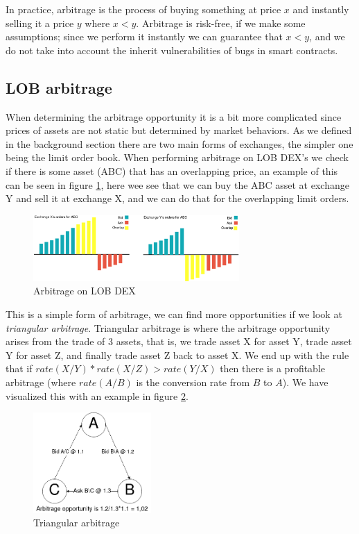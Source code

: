 In practice, arbitrage is the process of buying something at price $x$
and instantly selling it a price $y$ where $x<y$. Arbitrage is
risk-free, if we make some assumptions; since we perform it instantly
we can guarantee that $x<y$, and we do not take into account the
inherit vulnerabilities of bugs in smart contracts.

\subsection{LOB arbitrage}

When determining the arbitrage opportunity it is a bit more
complicated since prices of assets are not static but determined by
market behaviors. As we defined in the background section there are
two main forms of exchanges, the simpler one being the limit order
book. When performing arbitrage on LOB DEX's we check if there is some
asset (ABC) that has an overlapping price, an example of this can be
seen in figure \ref{fig:ArbLOB}, here wee see that we can buy the ABC
asset at exchange Y and sell it at exchange X, and we can do that for
the overlapping limit orders.
\begin{figure}[h]
\centering
\includegraphics[width=0.7\textwidth]{assests/Flash-loans-Arbitrage-Overlap-1}
\caption{Arbitrage on LOB DEX}
\label{fig:ArbLOB}
\end{figure}
This is a simple form of arbitrage, we can find more opportunities if
we look at \textit{triangular arbitrage}. Triangular arbitrage is
where the arbitrage opportunity arises from the trade of 3 assets, that
is, we trade asset X for asset Y, trade asset Y for asset Z, and
finally trade asset Z back to asset X. We end up with the rule that if
$rate(X/Y)*rate(X/Z)>rate(Y/X)$ then there is a profitable arbitrage
(where $rate(A/B)$ is the conversion rate from $B$ to $A$). We have
visualized this with an example in figure \ref{fig:ArbTrig}.
\begin{figure}[h]
\centering
\includegraphics[width=0.4\textwidth]{assests/Flash-loans-Arbitrage-triangular}
\caption{Triangular arbitrage}
\label{fig:ArbTrig}
\end{figure}

